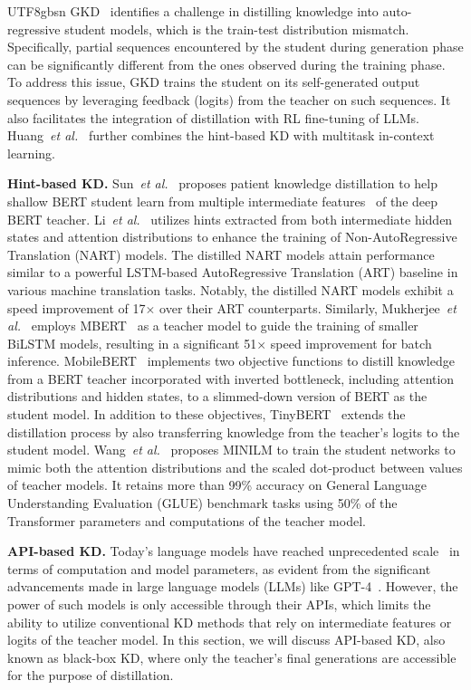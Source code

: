 \documentclass[10pt,journal,compsoc]{IEEEtran}
\newcommand{\etal}{\emph{et al.}}
\newcommand{\<}{\left\langle}
\renewcommand{\>}{\right\rangle}
\newcommand{\1}{\mathbbm{1}}
\begin{document}
\begin{CJK}{UTF8}{gbsn}
GKD~\cite{agarwal2023gkd} identifies a challenge in distilling knowledge into auto-regressive student models, which is the train-test distribution mismatch. Specifically, partial sequences encountered by the student during generation phase can be significantly different from the ones observed during the training phase. To address this issue, GKD trains the student on its self-generated output sequences by leveraging feedback (logits) from the teacher on such sequences. It also facilitates the integration of distillation with RL fine-tuning of LLMs. Huang~\etal~\cite{huang2022context} further combines the hint-based KD with multitask in-context learning.

\noindent\textbf{Hint-based KD.}
Sun~\etal~\cite{sun2019patient} proposes patient knowledge distillation to help shallow BERT student learn from multiple intermediate features~\cite{bae2023fast,sun2020mobilebert,jiao2019tinybert,wang2020minilm} of the deep BERT teacher.
Li~\etal~\cite{li2019hint} utilizes hints extracted from both intermediate hidden states and attention distributions to enhance the training of Non-AutoRegressive Translation (NART) models. The distilled NART models attain performance similar to a powerful LSTM-based AutoRegressive Translation (ART) baseline in various machine translation tasks. Notably, the distilled NART models exhibit a speed improvement of 17$\times$ over their ART counterparts. Similarly, Mukherjee~\etal~\cite{mukherjee2020xtremedistil} employs MBERT~\cite{tsai2019small} as a teacher model to guide the training of smaller BiLSTM models, resulting in a significant 51$\times$ speed improvement for batch inference. 
MobileBERT~\cite{sun2020mobilebert} implements two objective functions to distill knowledge from a BERT teacher incorporated with inverted bottleneck, including attention distributions and hidden states, to a slimmed-down version of BERT as the student model. In addition to these objectives, TinyBERT~\cite{jiao2019tinybert} extends the distillation process by also transferring knowledge from the teacher's logits to the student model.
Wang~\etal~\cite{wang2020minilm} proposes MINILM to train the student networks to mimic both the attention distributions and the scaled dot-product between values of teacher models. It retains more than 99\% accuracy on General Language Understanding Evaluation (GLUE) benchmark tasks using 50\% of the Transformer parameters and computations of the teacher model.

\noindent\textbf{API-based KD.}
Today's language models have reached unprecedented scale~\cite{brown2020language,wei2022emergent, schaeffer2023emergent} in terms of computation and model parameters, as evident from the significant advancements made in large language models (LLMs) like GPT-4~\cite{gpt4}. However, the power of such models is only accessible through their APIs, which limits the ability to utilize conventional KD methods that rely on intermediate features or logits of the teacher model. In this section, we will discuss API-based KD, also known as black-box KD, where only the teacher's final generations are accessible for the purpose of distillation.


\end{CJK}
\end{document}
